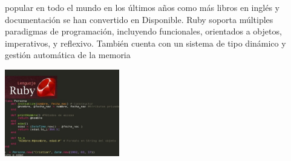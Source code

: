 \documentclass[twoside,twocolumn]{article}
\begin{document}
popular en todo el mundo en los últimos años como más libros en inglés y documentación se han convertido en
Disponible. Ruby soporta múltiples paradigmas de programación, incluyendo funcionales, orientados a objetos, imperativos,
y reflexivo. También cuenta con un sistema de tipo dinámico y gestión automática de la memoria
\begin{center}
	\includegraphics[width=5cm]{./Imagenes/2} 
	\end{center}
\end{document}
